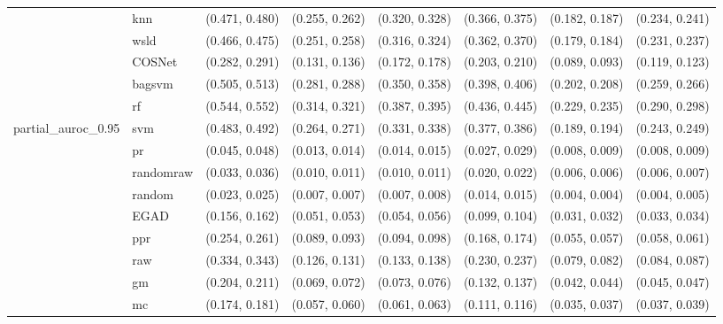 \begin{table}[H]
{\begin{tabular}{llllllll}
 & knn & (0.471, 0.480) & (0.255, 0.262) & (0.320, 0.328) & (0.366, 0.375) & (0.182, 0.187) & (0.234, 0.241)\\

 & wsld & (0.466, 0.475) & (0.251, 0.258) & (0.316, 0.324) & (0.362, 0.370) & (0.179, 0.184) & (0.231, 0.237)\\

 & COSNet & (0.282, 0.291) & (0.131, 0.136) & (0.172, 0.178) & (0.203, 0.210) & (0.089, 0.093) & (0.119, 0.123)\\

 & bagsvm & (0.505, 0.513) & (0.281, 0.288) & (0.350, 0.358) & (0.398, 0.406) & (0.202, 0.208) & (0.259, 0.266)\\

 & rf & (0.544, 0.552) & (0.314, 0.321) & (0.387, 0.395) & (0.436, 0.445) & (0.229, 0.235) & (0.290, 0.298)\\

\multirow{-15}{*}{\raggedright\arraybackslash partial\_auroc\_0.95} & svm & (0.483, 0.492) & (0.264, 0.271) & (0.331, 0.338) & (0.377, 0.386) & (0.189, 0.194) & (0.243, 0.249)\\
\cmidrule{1-8}
 & pr & (0.045, 0.048) & (0.013, 0.014) & (0.014, 0.015) & (0.027, 0.029) & (0.008, 0.009) & (0.008, 0.009)\\

 & randomraw & (0.033, 0.036) & (0.010, 0.011) & (0.010, 0.011) & (0.020, 0.022) & (0.006, 0.006) & (0.006, 0.007)\\

 & random & (0.023, 0.025) & (0.007, 0.007) & (0.007, 0.008) & (0.014, 0.015) & (0.004, 0.004) & (0.004, 0.005)\\

 & EGAD & (0.156, 0.162) & (0.051, 0.053) & (0.054, 0.056) & (0.099, 0.104) & (0.031, 0.032) & (0.033, 0.034)\\

 & ppr & (0.254, 0.261) & (0.089, 0.093) & (0.094, 0.098) & (0.168, 0.174) & (0.055, 0.057) & (0.058, 0.061)\\

 & raw & (0.334, 0.343) & (0.126, 0.131) & (0.133, 0.138) & (0.230, 0.237) & (0.079, 0.082) & (0.084, 0.087)\\

 & gm & (0.204, 0.211) & (0.069, 0.072) & (0.073, 0.076) & (0.132, 0.137) & (0.042, 0.044) & (0.045, 0.047)\\

 & mc & (0.174, 0.181) & (0.057, 0.060) & (0.061, 0.063) & (0.111, 0.116) & (0.035, 0.037) & (0.037, 0.039)\\


\end{tabular}}
\end{table}
